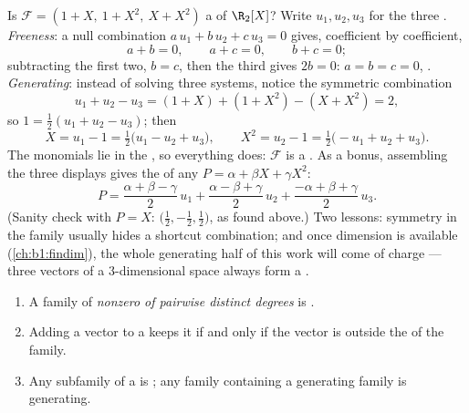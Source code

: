 \begin{example}
\label{ex:b1:vspaces:testbasis}
Is $\mathcal{F} = (1 + X,\ 1 + X^2,\ X + X^2)$ a  of
$\R_2[X]$? Write $u_1, u_2, u_3$ for the three .
\emph{Freeness}: a null combination $a\,u_1 + b\,u_2 + c\,u_3 =
0$ gives, coefficient by coefficient,
\[
a + b = 0, \qquad a + c = 0, \qquad b + c = 0 ;
\]
subtracting the first two, $b = c$, then the third gives $2b =
0$: $a = b = c = 0$, . \emph{Generating}: instead of solving
three systems, notice the symmetric combination
\[
u_1 + u_2 - u_3 = (1 + X) + (1 + X^2) - (X + X^2) = 2 ,
\]
so $1 = \frac12(u_1 + u_2 - u_3)$; then
\[
X = u_1 - 1 = \tfrac12\bigl(u_1 - u_2 + u_3\bigr),
\qquad
X^2 = u_2 - 1 = \tfrac12\bigl(-u_1 + u_2 + u_3\bigr).
\]
The monomials lie in the , so everything does: $\mathcal{F}$
is a . As a bonus, assembling the three displays gives the
 of any $P = \alpha + \beta X + \gamma X^2$:
\[
P = \frac{\alpha + \beta - \gamma}{2}\,u_1
+ \frac{\alpha - \beta + \gamma}{2}\,u_2
+ \frac{-\alpha + \beta + \gamma}{2}\,u_3 .
\]
(Sanity check with $P = X$:  $\bigl(\frac12,
-\frac12, \frac12\bigr)$, as found above.) Two lessons: symmetry
in the family usually hides a shortcut combination; and once
dimension is available (\cref{ch:b1:findim}), the whole
generating half of this work will come  of charge --- three
 vectors of a $3$-dimensional space always form a .
\end{example}

\begin{proposition}\label{prop:b1:vspaces:freecriteria}
\begin{enumerate}
  \item A family of \emph{nonzero  of pairwise distinct
        degrees} is .
  \item Adding a vector to a  keeps it  if and only
        if the vector is outside the  of the family.
  \item Any subfamily of a  is ; any family
        containing a generating family is generating.
\end{enumerate}
\end{proposition}

